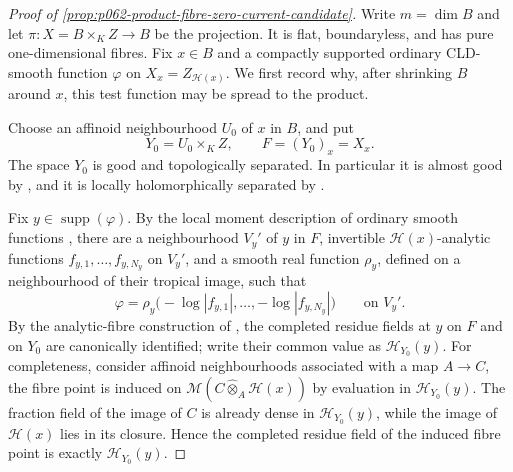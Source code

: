 
\begin{proof}[Proof of \cref{prop:p062-product-fibre-zero-current-candidate}]
Write \(m=\dim B\) and let
\(
 \pi\colon X=B\times_KZ\to B
\)
be the projection. It is flat, boundaryless, and has pure
one-dimensional fibres. Fix \(x\in B\) and a compactly supported ordinary
CLD-smooth function \(\varphi\) on \(X_x=Z_{\mathscr H(x)}\). We first
record why, after shrinking \(B\) around \(x\), this test function may be
spread to the product.

Choose an affinoid neighbourhood \(U_0\) of \(x\) in \(B\), and put
\[
                 Y_0=U_0\times_K Z,
                 \qquad F=(Y_0)_x=X_x.
\]
The space \(Y_0\) is good and topologically separated. In particular it
is almost good by \cite[\S11.1.10]{CLD25}, and it is locally
holomorphically separated by \cite[\S\S15.2.2--15.2.4]{CLD25}.

Fix \(y\in\operatorname{supp}(\varphi)\). By the local moment
description of ordinary smooth functions
\cite[Corollary~15.1.2]{CLD25}, there are a neighbourhood \(V_y'\) of
\(y\) in \(F\), invertible \(\mathscr H(x)\)-analytic functions
\(f_{y,1},\ldots,f_{y,N_y}\) on \(V_y'\), and a smooth real function
\(\rho_y\), defined on a neighbourhood of their tropical image, such
that
\[
 \varphi=\rho_y\bigl(-\log|f_{y,1}|,\ldots,
                         -\log|f_{y,N_y}|\bigr)
 \qquad\text{on }V_y'.
\]
By the analytic-fibre construction of \cite[\S11.1.10]{CLD25}, the
completed residue fields at \(y\) on \(F\) and on \(Y_0\) are canonically
identified; write their common value as \(\mathscr H_{Y_0}(y)\). For
completeness, consider affinoid neighbourhoods associated with a map
\(A\to C\), the fibre point is induced on
\(
 \mathcal M(C\widehat\otimes_A\mathscr H(x))
\)
by evaluation in \(\mathscr H_{Y_0}(y)\). The fraction field of the image
of \(C\) is already dense in \(\mathscr H_{Y_0}(y)\), while the image of
\(\mathscr H(x)\) lies in its closure. Hence the completed residue field
of the induced fibre point is exactly \(\mathscr H_{Y_0}(y)\).


\end{proof}
